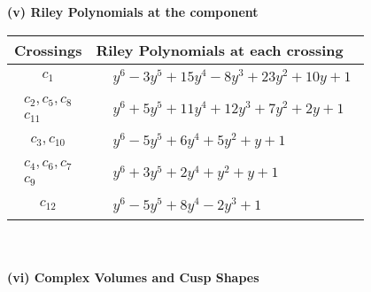 \documentclass[1p]{elsarticle_modified}
\theoremstyle{definition}
\begin{document}
\newpage\renewcommand{\arraystretch}{1}
\flushleft \textbf{(v) Riley Polynomials at the component}\newline \\
\begin{tabular}{m{50pt}|m{274pt}}
Crossings & \hspace{64pt}Riley Polynomials at each crossing \\
\hline $$\begin{aligned}c_{1}\end{aligned}$$&$\begin{aligned}
&y^6-3 y^5+15 y^4-8 y^3+23 y^2+10 y+1
\end{aligned}$\\
\hline $$\begin{aligned}c_{2},c_{5},c_{8}\\c_{11}\end{aligned}$$&$\begin{aligned}
&y^6+5 y^5+11 y^4+12 y^3+7 y^2+2 y+1
\end{aligned}$\\
\hline $$\begin{aligned}c_{3},c_{10}\end{aligned}$$&$\begin{aligned}
&y^6-5 y^5+6 y^4+5 y^2+y+1
\end{aligned}$\\
\hline $$\begin{aligned}c_{4},c_{6},c_{7}\\c_{9}\end{aligned}$$&$\begin{aligned}
&y^6+3 y^5+2 y^4+y^2+y+1
\end{aligned}$\\
\hline $$\begin{aligned}c_{12}\end{aligned}$$&$\begin{aligned}
&y^6-5 y^5+8 y^4-2 y^3+1
\end{aligned}$\\
\hline
\end{tabular}\\~\\
\newpage\flushleft \textbf{(vi) Complex Volumes and Cusp Shapes}
\end{document}
